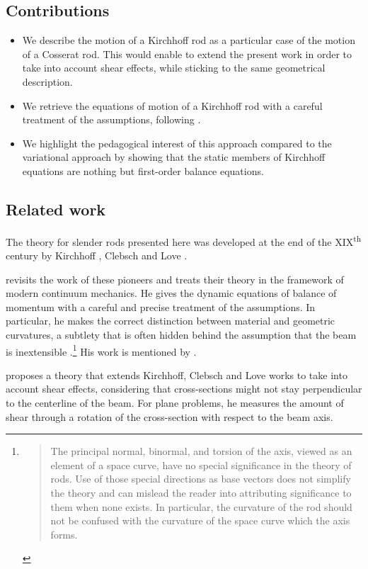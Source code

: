 \subsection{Contributions}
\begin{itemize}
\item We describe the motion of a Kirchhoff rod as a particular case of the motion of a Cosserat rod. This would enable to extend the present work in order to take into account shear effects, while sticking to the same geometrical description.
\item We retrieve the equations of motion of a Kirchhoff rod with a careful treatment of the assumptions, following \cite{Dill1992}.
\item We highlight the pedagogical interest of this approach compared to the variational approach by showing that the static members of Kirchhoff equations are nothing but first-order balance equations.
\end{itemize}

\subsection{Related work}

The theory for slender rods presented here was developed at the end of the XIX\textsuperscript{th} century by Kirchhoff \cite{Kirchhoff1850,Kirchhoff1876}, Clebsch \cite{Clebsch1883} and Love \cite{Love1906}.

 revisits the work of these pioneers and treats their theory in the framework of modern continuum mechanics. He gives the dynamic equations of balance of momentum with a careful and precise treatment of the assumptions. In particular, he makes the correct distinction between material and geometric curvatures, a subtlety that is often hidden behind the assumption that the beam is inextensible \cite{Adriaenssens1999,Douthe2007,DAmico2014}.\footnote{\blockcquote[p.~5]{Dill1992}{The principal normal, binormal, and torsion of the axis, viewed as an element of a space curve, have no special significance in the theory of rods. Use of those special directions as base vectors does not simplify the theory and can mislead the reader into attributing significance to them when none exists. In particular, the curvature of the rod should not be confused with the curvature of the space curve which the axis forms.}} His work is mentioned by .


 proposes a theory that extends Kirchhoff, Clebsch and Love works to take into account shear effects, considering that cross-sections might not stay perpendicular to the centerline of the beam. For plane problems, he measures the amount of shear through a rotation of the cross-section with respect to the beam axis.


